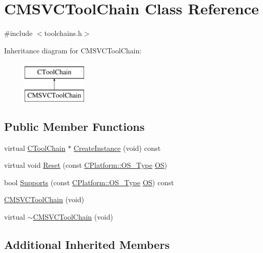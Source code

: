 \hypertarget{classCMSVCToolChain}{\section{C\-M\-S\-V\-C\-Tool\-Chain Class Reference}
\label{classCMSVCToolChain}
}


{\ttfamily \#include $<$toolchains.\-h$>$}

Inheritance diagram for C\-M\-S\-V\-C\-Tool\-Chain\-:\begin{figure}[H]
\begin{center}
\leavevmode
\includegraphics[height=2.000000cm]{d8/da2/classCMSVCToolChain}
\end{center}
\end{figure}
\subsection*{Public Member Functions}
\begin{DoxyCompactItemize}
\item 
virtual \hyperlink{classCToolChain}{C\-Tool\-Chain} $\ast$ \hyperlink{classCMSVCToolChain_a8291a8e4bf5895300d58de8b3140016e}{Create\-Instance} (void) const 
\item 
virtual void \hyperlink{classCMSVCToolChain_a11d29b3e4e3ac6e16b96adb29687d079}{Reset} (const \hyperlink{classCPlatform_a2fb735c63c53052f79629e338bb0f535}{C\-Platform\-::\-O\-S\-\_\-\-Type} \hyperlink{classCToolChain_abe4054d9081351e099163e2c53b260f8}{O\-S})
\item 
bool \hyperlink{classCMSVCToolChain_ae9dba3a4fc567e5f5618e372153fea62}{Supports} (const \hyperlink{classCPlatform_a2fb735c63c53052f79629e338bb0f535}{C\-Platform\-::\-O\-S\-\_\-\-Type} \hyperlink{classCToolChain_abe4054d9081351e099163e2c53b260f8}{O\-S}) const 
\item 
\hyperlink{classCMSVCToolChain_ab1448c980e2d32f8e61e4e652fff8472}{C\-M\-S\-V\-C\-Tool\-Chain} (void)
\item 
virtual \hyperlink{classCMSVCToolChain_a3608b07c0a90908fa95bd185fd75aca4}{$\sim$\-C\-M\-S\-V\-C\-Tool\-Chain} (void)
\end{DoxyCompactItemize}
\subsection*{Additional Inherited Members}


